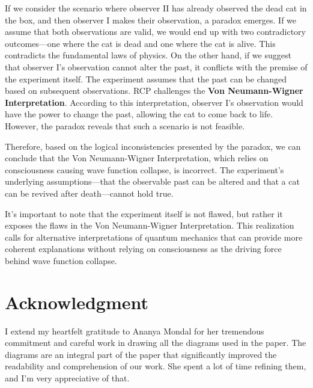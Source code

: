 \documentclass{article}
\begin{document}
If we consider the scenario where observer II has already observed the dead cat in the box, and then observer I makes their observation, a paradox emerges. If we assume that both observations are valid, we would end up with two contradictory outcomes—one where the cat is dead and one where the cat is alive. This contradicts the fundamental laws of physics.
On the other hand, if we suggest that observer I's observation cannot alter the past, it conflicts with the premise of the experiment itself. The experiment assumes that the past can be changed based on subsequent observations.
RCP challenges the \textbf{Von Neumann-Wigner Interpretation}. According to this interpretation, observer I's observation would have the power to change the past, allowing the cat to come back to life. However, the paradox reveals that such a scenario is not feasible.

Therefore, based on the logical inconsistencies presented by the paradox, we can conclude that the Von Neumann-Wigner Interpretation, which relies on consciousness causing wave function collapse, is incorrect. The experiment's underlying assumptions—that the observable past can be altered and that a cat can be revived after death—cannot hold true.

It's important to note that the experiment itself is not flawed, but rather it exposes the flaws in the Von Neumann-Wigner Interpretation. This realization calls for alternative interpretations of quantum mechanics that can provide more coherent explanations without relying on consciousness as the driving force behind wave function collapse.




\section{\Large \textbf{Acknowledgment}}

I extend my heartfelt gratitude to Ananya Mondal for her tremendous commitment and careful work in drawing all the diagrams used in the paper. The diagrams are an integral part of the paper that significantly improved the readability and comprehension of our work. She spent a lot of time refining them, and I'm very appreciative of that.
\end{document}
